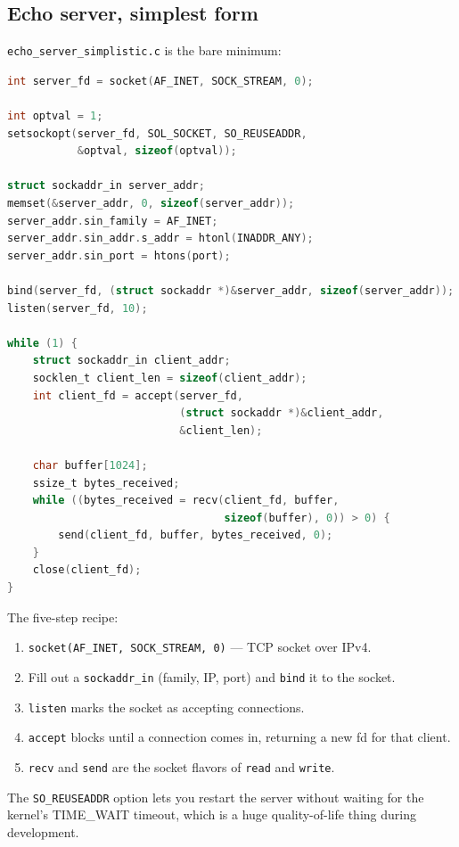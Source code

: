 \documentclass[11pt]{article}
\begin{document}
\subsection*{Echo server, simplest form}

\texttt{echo\_server\_simplistic.c} is the bare minimum:

\begin{lstlisting}[language=C]
int server_fd = socket(AF_INET, SOCK_STREAM, 0);

int optval = 1;
setsockopt(server_fd, SOL_SOCKET, SO_REUSEADDR,
           &optval, sizeof(optval));

struct sockaddr_in server_addr;
memset(&server_addr, 0, sizeof(server_addr));
server_addr.sin_family = AF_INET;
server_addr.sin_addr.s_addr = htonl(INADDR_ANY);
server_addr.sin_port = htons(port);

bind(server_fd, (struct sockaddr *)&server_addr, sizeof(server_addr));
listen(server_fd, 10);

while (1) {
    struct sockaddr_in client_addr;
    socklen_t client_len = sizeof(client_addr);
    int client_fd = accept(server_fd,
                           (struct sockaddr *)&client_addr,
                           &client_len);

    char buffer[1024];
    ssize_t bytes_received;
    while ((bytes_received = recv(client_fd, buffer,
                                  sizeof(buffer), 0)) > 0) {
        send(client_fd, buffer, bytes_received, 0);
    }
    close(client_fd);
}
\end{lstlisting}

The five-step recipe:
\begin{enumerate}
  \item \texttt{socket(AF\_INET, SOCK\_STREAM, 0)} --- TCP socket
    over IPv4.
  \item Fill out a \texttt{sockaddr\_in} (family, IP, port) and
    \texttt{bind} it to the socket.
  \item \texttt{listen} marks the socket as accepting connections.
  \item \texttt{accept} blocks until a connection comes in,
    returning a new fd for that client.
  \item \texttt{recv} and \texttt{send} are the socket flavors of
    \texttt{read} and \texttt{write}.
\end{enumerate}

The \texttt{SO\_REUSEADDR} option lets you restart the server
without waiting for the kernel's TIME\_WAIT timeout, which is a
huge quality-of-life thing during development.
\end{document}

